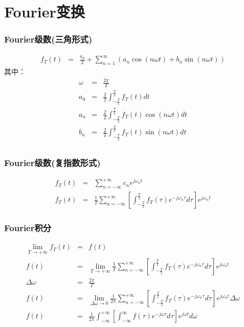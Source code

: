 \documentclass{beamer}
\begin{document}
\section{Fourier变换}
\label{sec-5}
\begin{frame}
\frametitle{Fourier级数(三角形式)}
\label{sec-5-1}

\begin{eqnarray*}
f_T(t) & =& \frac{a_0}{2}+\sum_{n=1}^{\infty}(a_n\cos(n\omega t)+b_n\sin(n\omega t))  
\end{eqnarray*}
其中：
\begin{eqnarray*}
\omega & =& \frac{2\pi}{T}\\
a_0 &=& \frac{2}{T}\int_{-\frac{T}{2}}^{\frac{T}{2}}f_T(t)dt \\
a_n &=& \frac{2}{T}\int_{-\frac{T}{2}}^{\frac{T}{2}}f_T(t)\cos(n\omega t)dt \\
b_n &=& \frac{2}{T}\int_{-\frac{T}{2}}^{\frac{T}{2}}f_T(t)\sin(n\omega t)dt \\
\end{eqnarray*}
\end{frame}
\begin{frame}
\frametitle{Fourier级数(复指数形式)}
\label{sec-5-2}

\begin{eqnarray*}
f_T(t) & = & \sum_{n=-\infty}^{+ \infty}c_n e^{j\omega_n t} \\
f_T(t) & = & \frac{1}{T}\sum_{n=-\infty}^{+\infty}\left[ \int_{- \frac{T}{2} }^{\frac{T}{2}}f_T(\tau)e^{-j\omega_n\tau}d\tau\right] e^{j\omega_n t} 
\end{eqnarray*}
\end{frame}
\begin{frame}
\frametitle{Fourier积分}
\label{sec-5-3}

\begin{eqnarray*}
\lim_{T\rightarrow+\infty}f_T(t) &=& f(t) \\
f(t) & = & \lim_{T\rightarrow+\infty}\frac{1}{T}\sum_{n=-\infty}^{+\infty}\left[ \int_{- \frac{T}{2} }^{\frac{T}{2}}f_T(\tau)e^{-j\omega_n\tau}d\tau\right] e^{j\omega_n t} \\
\Delta\omega &=& \frac{2\pi}{T} \\
f(t) & = & \lim_{\Delta\omega\rightarrow 0}\frac{1}{2\pi}\sum_{n=-\infty}^{+ \infty}\left[ \int_{- \frac{T}{2} }^{\frac{T}{2}}f_T(\tau)e^{-j\omega_n\tau}d\tau\right] e^{j\omega_n t}\Delta\omega \\
f(t) & = & \frac{1}{2\pi}\int_{-\infty}^{+\infty}\left[ \int_{-\infty }^{\infty}f(\tau)e^{-j\omega\tau}d\tau\right] e^{j\omega t}d\omega
\end{eqnarray*}
\end{frame}
\end{document}
